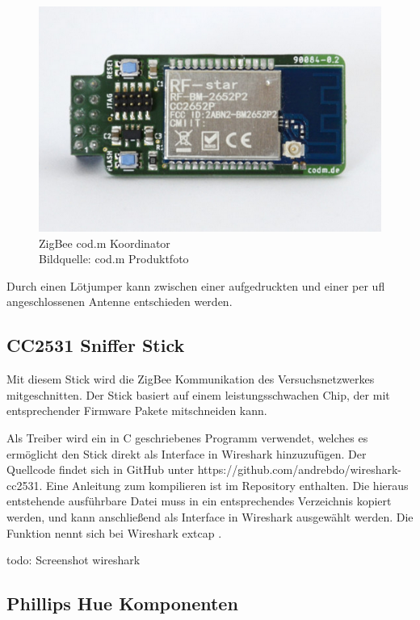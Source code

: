 \begin{figure}[H]
  \centering
  \includegraphics[width=1\textwidth]{media/codm.png}
  \caption{ZigBee cod.m Koordinator \\ Bildquelle: cod.m Produktfoto}
\end{figure}

Durch einen Lötjumper kann zwischen einer aufgedruckten und einer per \grqq ufl\grqq{} angeschlossenen Antenne entschieden werden.

\subsection{CC2531 Sniffer Stick}

Mit diesem Stick wird die ZigBee Kommunikation des Versuchsnetzwerkes mitgeschnitten.
Der Stick basiert auf einem leistungsschwachen Chip, der mit entsprechender Firmware Pakete mitschneiden kann. 

Als Treiber wird ein in C geschriebenes Programm verwendet, welches es ermöglicht den Stick direkt als Interface in Wireshark hinzuzufügen. Der Quellcode findet sich in 
GitHub unter https://github.com/andrebdo/wireshark-cc2531. Eine Anleitung zum kompilieren ist im Repository enthalten. Die hieraus entstehende ausführbare Datei muss in ein
entsprechendes Verzeichnis kopiert werden, und kann anschließend als Interface in Wireshark ausgewählt werden. Die Funktion nennt sich bei Wireshark \grqq extcap \grqq{}.

todo: Screenshot wireshark

\subsection{Phillips Hue Komponenten}

